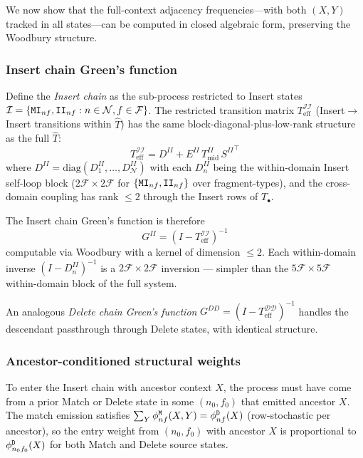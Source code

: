 \documentclass{article}
\newcommand\dom{n}
\newcommand\ndom{\mathcal{N}}
\newcommand\nfrag{\mathcal{F}}
\newcommand\nonemptytrans{T}
\newcommand\mat{{\tt M}}
\newcommand\ins{{\tt I}}
\newcommand\del{{\tt D}}
\newcommand\effT{\hat{T}}
\newcommand\frag{f}
\begin{document}
We now show that the full-context adjacency frequencies---with both
$(X,Y)$ tracked in all states---can be computed in closed algebraic
form, preserving the Woodbury structure.

\subsubsection{Insert chain Green's function}

Define the \emph{Insert chain} as the sub-process restricted to Insert states
$\mathcal{I} = \{\mat\ins_{\dom\frag}, \ins\ins_{\dom\frag}
: \dom \in \ndom, \frag \in \nfrag\}$.
The restricted transition matrix $T^{\mathcal{II}}_{\text{eff}}$
(Insert$\to$Insert transitions within $\effT$) has the same
block-diagonal-plus-low-rank structure as the full $\effT$:
\[
T^{\mathcal{II}}_{\text{eff}} = D^{II} + E^{II}\, \nonemptytrans^{II}_{\text{mid}}\, {S^{II}}^\top
\]
where $D^{II} = \text{diag}(D^{II}_1, \ldots, D^{II}_\ndom)$
with each $D^{II}_\dom$ being the within-domain Insert self-loop block
($2\nfrag \times 2\nfrag$ for $\{\mat\ins_{\dom\frag},
\ins\ins_{\dom\frag}\}$ over fragment-types),
and the cross-domain coupling has rank $\leq 2$ through the Insert rows
of $\nonemptytrans_\bullet$.

The Insert chain Green's function is therefore
\[
G^{II} = (I - T^{\mathcal{II}}_{\text{eff}})^{-1}
\]
computable via Woodbury with a kernel of dimension $\leq 2$.
Each within-domain inverse $(I - D^{II}_\dom)^{-1}$ is a
$2\nfrag \times 2\nfrag$ inversion --- simpler than the
$5\nfrag \times 5\nfrag$ within-domain block of the full system.

An analogous \emph{Delete chain Green's function}
$G^{DD} = (I - T^{\mathcal{DD}}_{\text{eff}})^{-1}$ handles the
descendant passthrough through Delete states, with identical structure.

\subsubsection{Ancestor-conditioned structural weights}

To enter the Insert chain with ancestor context $X$, the process must
have come from a prior Match or Delete state in some $(\dom_0, \frag_0)$
that emitted ancestor $X$.
The match emission satisfies $\sum_Y \phi^{\mat}_{\dom\frag}(X,Y)
= \phi^{\del}_{\dom\frag}(X)$ (row-stochastic per ancestor), so the
entry weight from $(\dom_0, \frag_0)$ with ancestor $X$ is proportional
to $\phi^{\del}_{\dom_0\frag_0}(X)$ for both Match and Delete source
states.
\end{document}
